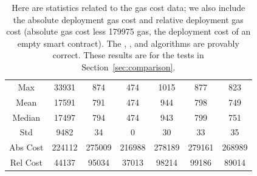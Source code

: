 \begin{table}[p]
\centering
\begin{tabular}{|c|
    |S[table-format=6.0]|S[table-format=6.0]
    |S[table-format=6.0]|S[table-format=6.0]
    |S[table-format=6.0]|S[table-format=6.0]|}
\hline
& \Uniswap{} & \prb{} & \prbTwo{} & \OpenZeppelin{} & \abdk{} & \OpenZeppelinTwo{} \\
\hline
Max      &  33931 &    874 &    474 &   1015 &    877 &    823 \\
Mean     &  17591 &    791 &    474 &    944 &    798 &    749 \\
Median   &  17497 &    794 &    474 &    943 &    799 &    751 \\
Std      &   9482 &     34 &      0 &     30 &     33 &     35 \\
\hline
Abs Cost & 224112 & 275009 & 216988 & 278189 & 279161 & 268989 \\
Rel Cost &  44137 &  95034 &  37013 &  98214 &  99186 &  89014 \\
\hline
\end{tabular}
\caption[Gas Costs Statistics 1]{Here are statistics
    related to the gas cost data;
    we also include the absolute deployment gas cost and
    relative deployment gas cost
    (absolute gas cost less \num{179975} gas,
    the deployment cost of an empty smart contract).
    The \Uniswap{}, \prbTwo{}, and \OpenZeppelinTwo{} algorithms
    are provably correct.
    These results are for the tests in Section~\ref{sec:comparison}.
    }
\label{table:gas_costs_1}
\end{table}
